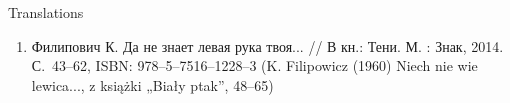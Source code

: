 \documentclass{resume} %
\begin{document}
\begin{rSection}{Translations}
\begin{enumerate}
\item Филипович К. Да не знает левая рука твоя... // В кн.: Тени. М. : Знак, 2014. С.~43--62, ISBN: 978--5--7516--1228--3 (K. Filipowicz (1960) Niech nie wie lewica..., z książki „Biały ptak”, 48--65)
\end{enumerate}
\end{rSection}





\end{document}
